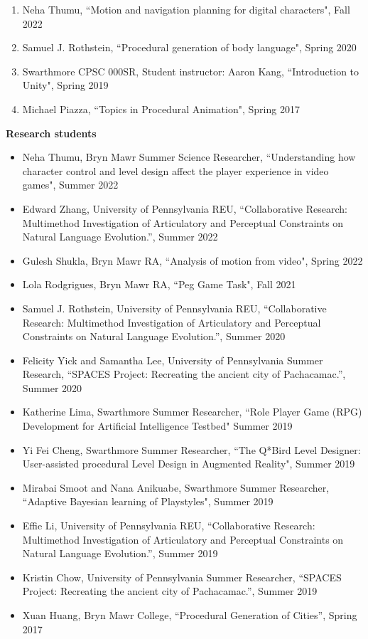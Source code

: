 \begin{enumerate}[leftmargin=*,label={}]
\item Neha Thumu, ``Motion and navigation planning for digital characters", Fall 2022
\item Samuel J. Rothstein, ``Procedural generation of body language", Spring 2020
\item Swarthmore CPSC 000SR, Student instructor: Aaron Kang, ``Introduction to Unity", Spring 2019
\item Michael Piazza, ``Topics in Procedural Animation", Spring 2017
\end{enumerate}

{\bf Research students} 
\vspace{-1.0em}

\begin{itemize}[leftmargin=*,label={}]
\item Neha Thumu, Bryn Mawr Summer Science Researcher, ``Understanding how character control and level design affect the player experience in video games", Summer 2022
\item Edward Zhang, University of Pennsylvania REU, ``Collaborative Research: Multimethod Investigation of Articulatory and Perceptual Constraints on Natural Language Evolution.'', Summer 2022 
\item Gulesh Shukla, Bryn Mawr RA, ``Analysis of motion from video", Spring 2022
\item Lola Rodgrigues, Bryn Mawr RA, ``Peg Game Task", Fall 2021
\item Samuel J. Rothstein, University of Pennsylvania REU, ``Collaborative Research: Multimethod Investigation of Articulatory and Perceptual Constraints on Natural Language Evolution.'', Summer 2020 
\item Felicity Yick and Samantha Lee, University of Pennsylvania Summer Research, ``SPACES Project: Recreating the ancient city of Pachacamac.'', Summer 2020 
\item Katherine Lima, Swarthmore Summer Researcher, ``Role Player Game (RPG) Development for Artificial Intelligence Testbed" Summer 2019
\item Yi Fei Cheng, Swarthmore Summer Researcher, ``The Q*Bird Level Designer: User-assisted procedural Level Design in Augmented Reality", Summer 2019
\item Mirabai Smoot and Nana Anikuabe, Swarthmore Summer Researcher, ``Adaptive Bayesian learning of Playstyles", Summer 2019 
\item Effie Li, University of Pennsylvania REU, ``Collaborative Research: Multimethod Investigation of Articulatory and Perceptual Constraints on Natural Language Evolution.'', Summer 2019 
\item Kristin Chow, University of Pennsylvania Summer Researcher, ``SPACES Project: Recreating the ancient city of Pachacamac.'', Summer 2019 
\item Xuan Huang, Bryn Mawr College, ``Procedural Generation of Cities'', Spring 2017
\end{itemize}


